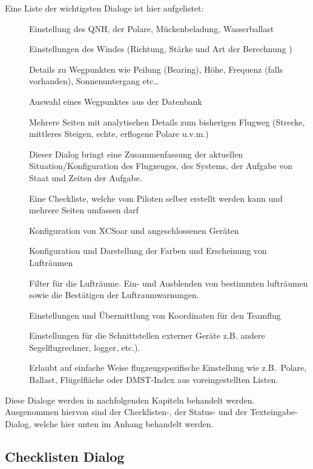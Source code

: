 Eine Liste der wichtigsten Dialoge ist hier aufgelistet:
\begin{description}
\item[] Einstellung des QNH, der Polare, Mückenbeladung, Wasserballast
\item[] Einstellungen des Windes (Richtung, Stärke und Art der Berechnung )
\item[] Details zu Wegpunkten wie Peilung (Bearing), Höhe, Frequenz (falls vorhanden), Sonnenuntergang  etc\dots
\item[] Auswahl eines Wegpunktes aus der Datenbank
\item[] Mehrere Seiten mit analytischen Details zum bisherigen Flugweg (Strecke, mittleres Steigen, echte, erflogene Polare u.v.m.)
\item[] Dieser Dialog bringt eine Zusammenfassung der aktuellen Situation/Konfiguration  des Flugzeuges, des Systems, der Aufgabe von Staat und Zeiten der Aufgabe.
\item[] Eine Checkliste, welche vom Piloten selber erstellt werden kann und mehrere Seiten umfassen darf
\item[] Konfiguration von  \textsf{XCSoar} und angeschlossenen Geräten
\item[] Konfiguration und Darstellung der Farben und Erscheinung von Lufträumen
\item[] Filter für die Lufträume. Ein- und Ausblenden von bestimmten lufträumen sowie die Bestätigen der Luftraumwarnungen.
\item[] Einstellungen und Übermittlung von Koordinaten für den Teamflug
\item[] Einstellungen für die Schnittstellen externer Geräte z.B.  andere Segelflugrechner,  logger, \fl etc.).
\item[] Erlaubt auf einfache Weise flugzeugspezifische Einstellung wie z.B.\ Polare, Ballast, Flügelfläche oder DMST-Index aus voreingestellten Listen.
\end{description}

Diese Dialoge werden in nachfolgenden Kapiteln behandelt werden. Ausgenommen hiervon sind der Checklisten-, der Status-  und der Texteingabe-Dialog, welche hier unten im Anhang behandelt werden.

\subsection*{Checklisten Dialog}

